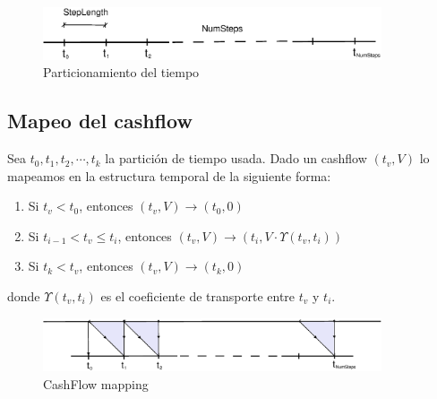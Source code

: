 \begin{figure}[!hb]
\begin{center}
\includegraphics[width=10cm,angle=0]{./images/time.eps}
\caption{Particionamiento del tiempo}
\label{timetranches}
\end{center}
\end{figure}

\subsection{Mapeo del cashflow}

Sea $t_0, t_1, t_2, \cdots, t_k$ la partici\'on de tiempo usada.
Dado un cashflow $(t_v,V)$ lo mapeamos en la estructura
temporal de la siguiente forma:

\begin{enumerate}
\item Si $t_v < t_0$, entonces $(t_v,V) \longrightarrow (t_0,0)$
\item Si $t_{i-1} < t_v \leq t_i$, entonces $(t_v,V) \longrightarrow (t_i,V \cdot \Upsilon(t_v,t_i))$
\item Si $t_k < t_v$, entonces $(t_v,V) \longrightarrow (t_k,0)$
\end{enumerate}

donde $\Upsilon(t_v,t_i)$ es el coeficiente de transporte entre $t_v$ y $t_i$.

\begin{figure}[!hb]
\begin{center}
\includegraphics[width=10cm,angle=0]{./images/cashflowmapping.eps}
\caption{CashFlow mapping}
\label{timetranches}
\end{center}
\end{figure}


